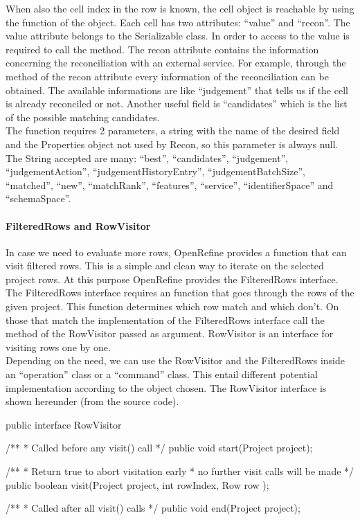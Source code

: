 When also the cell index in the row is known, the cell object is reachable by using the  function of the  object. Each cell has two attributes: ``value'' and ``recon''. The value attribute belongs to the Serializable class. In order to access to the value is required to call the  method. The recon attribute contains the information concerning the reconciliation with an external service.
For example, through the  method of the recon attribute every information of the reconciliation can be obtained. The available informations are like ``judgement'' that tells us if the cell is already reconciled or not. Another useful field is ``candidates'' which is the list of the possible matching candidates.\\
The  function requires 2 parameters, a string with the name of the desired field and the Properties object not used by Recon, so this parameter is always null. The String accepted are many: ``best'', ``candidates'', ``judgement'', ``judgementAction'', ``judgementHistoryEntry'', ``judgementBatchSize'', ``matched'', ``new'', ``matchRank'', ``features'', ``service'', ``identifierSpace'' and ``schemaSpace''. 

\paragraph{FilteredRows and RowVisitor} In case we need to evaluate more rows, OpenRefine provides a function that can visit filtered rows. This is a simple and clean way to iterate on the selected project rows. At this purpose OpenRefine provides the FilteredRows interface. The FilteredRows interface requires an  function that goes through the rows of the given project. This function determines which row match and which don't. On those that match the implementation of the FilteredRows interface call the method  of the RowVisitor passed as argument. RowVisitor is an interface for visiting rows one by one.\\
Depending on the need, we can use the RowVisitor and the FilteredRows inside an ``operation'' class or a ``command'' class. This entail different potential implementation according to the object chosen.
The RowVisitor interface is shown hereunder (from the source code).
\begin{code}
public interface RowVisitor{

   /** 
    * Called before any visit() call
    */
   public void start(Project project);
   
   /** 
    * Return true to abort visitation early
    * no further visit calls will be made
    */
   public boolean visit(Project project,
                        int rowIndex,
                        Row row
   );
   
   /**
    * Called after all visit() calls
    */   
   public void end(Project project);
}
\end{code} 

